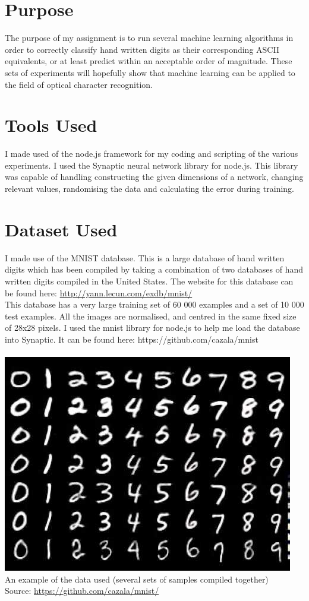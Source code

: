 \documentclass[11pt]{article}
\begin{document}
\begin{page}
\section{Purpose}
The purpose of my assignment is to run several machine learning algorithms in order to correctly classify hand written digits as their corresponding ASCII equivalents, or at least predict within an acceptable order of magnitude. These sets of experiments will hopefully show that machine learning can be applied to the field of optical character recognition.

\section{Tools Used}
I made used of the node.js framework for my coding and scripting of the various experiments. I used the Synaptic neural network library for node.js. This library was capable of handling constructing the given dimensions of a network, changing relevant values, randomising the data and calculating the error during training.

\section{Dataset Used}
I made use of the MNIST database. This is a large database of hand written digits which has been compiled by taking a combination of two databases of hand written digits compiled in the United States. The website for this database can be found here: \url{http://yann.lecun.com/exdb/mnist/} \\

This database has a very large training set of 60 000 examples and a set of 10 000 test examples. All the images are normalised, and centred in the same fixed size of 28x28 pixels.
I used the mnist library for node.js to help me load the database into Synaptic. It can be found here: https://github.com/cazala/mnist \\\\

\includegraphics[scale=0.7]{1}\\
An example of the data used (several sets of samples compiled together) \\
Source: \url{https://github.com/cazala/mnist/}\\


\end{page}
\end{document}
